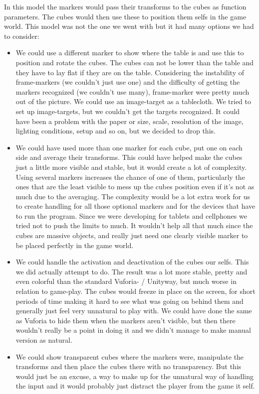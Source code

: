 In this model the markers would pass their transforms to the cubes as function parameters. The cubes would then use these to position them selfs in the game world. This model was not the one we went with but it had many options we had to consider:
\begin{itemize}
  \item We could use a different marker to show where the table is and use this to position and rotate the cubes. The cubes can not be lower than the table and they have to lay flat if they are on the table. Considering the instability of frame-markers (we couldn't just use one) and the difficulty of getting the markers recognized (we couldn't use many), frame-marker were pretty much out of the picture. We could use an image-target as a tablecloth. We tried to set up image-targets, but we couldn't get the targets recognized. It could have been a problem with the paper or size, scale, resolution of the image, lighting conditions, setup and so on, but we decided to drop this.
  \item We could have used more than one marker for each cube, put one on each side and average their transforms. This could have helped make the cubes just a little more visible and stable, but it would create a lot of complexity. Using several markers increases the chance of one of them, particularly the ones that are the least visible to mess up the cubes position even if it's not as much due to the averaging. The complexity would be a lot extra work for us to create handling for all those optional markers and for the devices that have to run the program. Since we were developing for tablets and cellphones we tried not to push the limits to much. It wouldn't help all that much since the cubes are massive objects, and really just need one clearly visible marker to be placed perfectly in the game world.
  \item We could handle the activation and deactivation of the cubes our selfs. This we did actually attempt to do. The result was a lot more stable, pretty and even colorful than the standard Vuforia- / Unityway, but much worse in relation to game-play. The cubes would freeze in place on the screen, for short periods of time making it hard to see what was going on behind them and generally just feel very unnatural to play with. We could have done the same as Vuforia to hide them when the markers aren't visible, but then there wouldn't really be a point in doing it and we didn't manage to make manual version as natural. 
  \item We could show transparent cubes where the markers were, manipulate the transforms and then place the cubes there with no transparency. But this would just be an excuse, a way to make up for the unnatural way of handling the input and it would probably just distract the player from the game it self.
\end{itemize}


